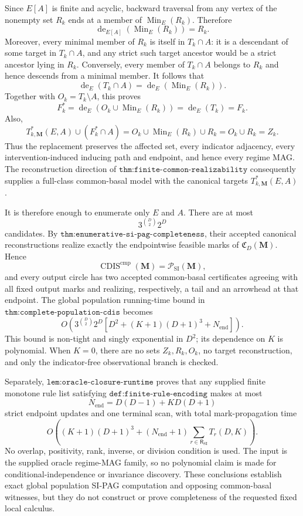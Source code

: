 Since \(E[A]\) is finite and acyclic, backward traversal from any vertex of the nonempty set \(R_k\) ends at a member of \(\operatorname{Min}_E(R_k)\).  Therefore
\[
\operatorname{de}_{E[A]}\!\left(\operatorname{Min}_E(R_k)\right)=R_k.
\]
Moreover, every minimal member of \(R_k\) is itself in \(T_k\cap A\): it is a descendant of some target in \(T_k\cap A\), and any strict such target ancestor would be a strict ancestor lying in \(R_k\).  Conversely, every member of \(T_k\cap A\) belongs to \(R_k\) and hence descends from a minimal member.  It follows that
\[
\operatorname{de}_E(T_k\cap A)
=\operatorname{de}_E\!\left(\operatorname{Min}_E(R_k)\right).
\]
Together with \(O_k=T_k\setminus A\), this proves
\[
F_k^{*}
=\operatorname{de}_E\!\left(O_k\cup\operatorname{Min}_E(R_k)\right)
=\operatorname{de}_E(T_k)
=F_k.
\]
Also,
\[
T^{*}_{k,\mathbf M}(E,A)\cup(F_k^{*}\cap A)
=O_k\cup\operatorname{Min}_E(R_k)\cup R_k
=O_k\cup R_k
=Z_k.
\]
Thus the replacement preserves the affected set, every indicator adjacency, every intervention-induced inducing path and endpoint, and hence every regime MAG.  The reconstruction direction of \(\texttt{thm:finite-common-realizability}\) consequently supplies a full-class common-basal model with the canonical targets \(T^{*}_{k,\mathbf M}(E,A)\).

It is therefore enough to enumerate only \(E\) and \(A\).  There are at most
\[
3^{\binom D2}2^D
\]
candidates.  By \(\texttt{thm:enumerative-si-pag-completeness}\), their accepted canonical reconstructions realize exactly the endpointwise feasible marks of \(\mathfrak C_D(\mathbf M)\).  Hence
\[
\operatorname{CDIS}^{\mathrm{cmp}}(\mathbf M)=\mathcal P_{\mathrm{SI}}(\mathbf M),
\]
and every output circle has two accepted common-basal certificates agreeing with all fixed output marks and realizing, respectively, a tail and an arrowhead at that endpoint.  The global population running-time bound in \(\texttt{thm:complete-population-cdis}\) becomes
\[
O\!\left(
3^{\binom D2}2^D
\left[D^2+(K+1)(D+1)^3+N_{\mathrm{end}}\right]
\right).
\]
This bound is non-tight and singly exponential in \(D^2\); its dependence on \(K\) is polynomial.  When \(K=0\), there are no sets \(Z_k,R_k,O_k\), no target reconstruction, and only the indicator-free observational branch is checked.

Separately, \(\texttt{lem:oracle-closure-runtime}\) proves that any supplied finite monotone rule list satisfying \(\texttt{def:finite-rule-encoding}\) makes at most
\[
N_{\mathrm{end}}=D(D-1)+KD(D+1)
\]
strict endpoint updates and one terminal scan, with total mark-propagation time
\[
O\!\left(
(K+1)(D+1)^3+
(N_{\mathrm{end}}+1)
\sum_{r\in\mathsf R_{\mathrm{SI}}}T_r(D,K)
\right).
\]
No overlap, positivity, rank, inverse, or division condition is used.  The input is the supplied oracle regime-MAG family, so no polynomial claim is made for conditional-independence or invariance discovery.  These conclusions establish exact global population SI-PAG computation and opposing common-basal witnesses, but they do not construct or prove completeness of the requested fixed local calculus.